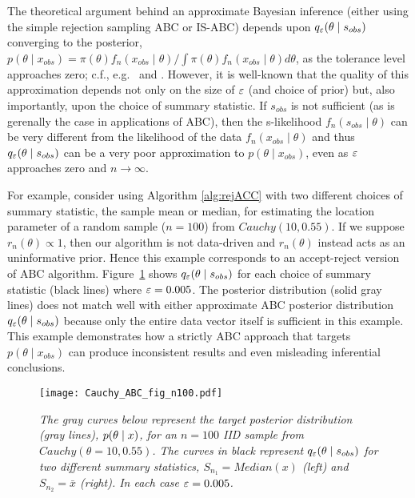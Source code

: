 \vspace{-6mm} 

\noindent
\hrulefill

The theoretical argument behind an approximate Bayesian inference (either using the simple rejection sampling ABC or IS-ABC) %
 depends upon $q_{\varepsilon}(\theta\mid s_{\relax obs})$ converging to the posterior, $p(\theta \mid x_{obs}) = {\pi(\theta) f_n ( x_{obs} \mid\theta)}\big/{\int \pi(\theta) f_n ( x_{obs} \mid\theta)
d \theta }$, as the tolerance level approaches zero; c.f., e.g.~\cite{Marin2011} and \cite{Beaumont2019}. However, it is well-known that the quality of this approximation depends not only on the size of $\varepsilon$ (and choice of prior) but, also importantly, upon the choice of summary statistic. If $s_{obs}$ is not sufficient (as is gerenally the case in applications of ABC), then the s-likelihood $f_n (s_{obs} \mid\theta)$ can be very different from the likelihood of the data $f_n ( x_{obs} \mid\theta)$ and thus $q_{\varepsilon}(\theta\mid s_{\relax obs})$ can be a very poor approximation to $p(\theta\mid x_{obs})$, even as $\varepsilon$ approaches zero and $n \rightarrow \infty$.

For example, consider using Algorithm \ref{alg:rejACC} with two different choices of summary statistic, the sample mean or median, for estimating the location parameter of a random sample ($n=100$) from $Cauchy(10, 0.55)$. If we suppose $r_n(\theta) \propto 1$, then our algorithm is not data-driven and $r_n(\theta)$ instead acts as an uninformative prior. Hence this example corresponds to an accept-reject version of ABC algorithm. 
Figure~\ref{fig:ACC} shows $q_{\varepsilon}(\theta\mid s_{\relax obs})$ for each choice of summary statistic (black lines) where $\varepsilon = 0.005$. 
The posterior distribution (solid gray lines) does not match well with either approximate ABC posterior distribution $q_{\varepsilon}(\theta\mid s_{\relax obs})$ because only the entire data vector itself is sufficient in this example. This example demonstrates how a strictly ABC approach that targets $p(\theta \mid x_{obs})$ can produce inconsistent results and even misleading inferential conclusions.

\begin{figure}
\centering
\caption{{\it The gray curves below represent the target posterior distribution (gray lines), $p(\theta \mid {}{x})$, for an $n=100$ IID sample from $Cauchy(\theta=10,0.55)$. The curves in black represent  $q_{\varepsilon}(\theta \mid s_{obs})$ for two different summary statistics, $S_{n_1} = Median(x)$ (left) and $S_{n_2} = \bar{x}$ (right). In each case $\varepsilon = 0.005$.} }\label{fig:ACC}
\texttt{[image: Cauchy\_ABC\_fig\_n100.pdf]}
\end{figure}	


